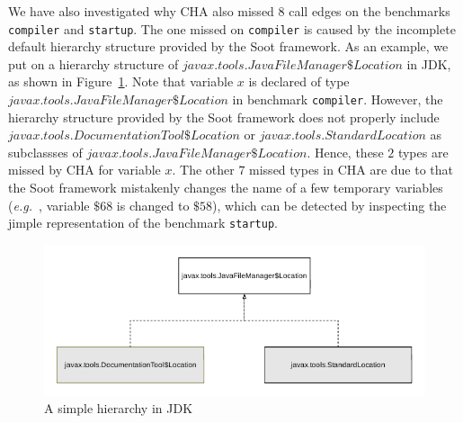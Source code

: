 \documentclass{fac}
\newcommand\eg{\textit{e.g.\ }}
\begin{document}
We have also investigated why CHA also missed $8$ call edges on the benchmarks \texttt{compiler} and \texttt{startup}. The one missed on \texttt{compiler} is caused by the incomplete default hierarchy structure provided by the Soot framework. As an example, we put on a hierarchy structure of $javax.tools.JavaFileManager\$Location$ in JDK, as shown in Figure~\ref{fig:cha-hierarchy}. Note that variable $x$ is declared of type $javax.tools.JavaFileManager\$Location$ in benchmark \texttt{compiler}. However, the hierarchy structure provided by the Soot framework does not properly include $javax.tools.DocumentationTool\$Location$ or $javax.tools.StandardLocation$ as subclassses of $javax.tools.JavaFileManager\$Location$. Hence, these $2$ types are missed by CHA for variable $x$. The other $7$ missed types in CHA are due to that the Soot framework mistakenly changes the name of a few temporary variables (\eg, variable $\$68$ is changed to $\$58$), which can be detected by inspecting the jimple representation of the benchmark \texttt{startup}. %



\begin{figure}
\centering
\includegraphics[scale=1]{cha-hierarchy.pdf}
\caption{A simple hierarchy in JDK}
\label{fig:cha-hierarchy}
\end{figure}
\end{document}
